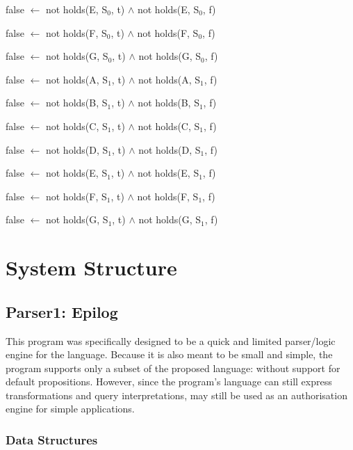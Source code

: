 \documentclass[a4paper]{article}
\begin{document}
\begin{list}{}{Complementary Rules}
            false $\leftarrow$ not holds(E, S$_{0}$, t) $\land$ not holds(E, S$_{0}$, f)
          \item
            false $\leftarrow$ not holds(F, S$_{0}$, t) $\land$ not holds(F, S$_{0}$, f)
          \item
            false $\leftarrow$ not holds(G, S$_{0}$, t) $\land$ not holds(G, S$_{0}$, f)
          \item
            false $\leftarrow$ not holds(A, S$_{1}$, t) $\land$ not holds(A, S$_{1}$, f)
          \item
            false $\leftarrow$ not holds(B, S$_{1}$, t) $\land$ not holds(B, S$_{1}$, f)
          \item
            false $\leftarrow$ not holds(C, S$_{1}$, t) $\land$ not holds(C, S$_{1}$, f)
          \item
            false $\leftarrow$ not holds(D, S$_{1}$, t) $\land$ not holds(D, S$_{1}$, f)
          \item
            false $\leftarrow$ not holds(E, S$_{1}$, t) $\land$ not holds(E, S$_{1}$, f)
          \item
            false $\leftarrow$ not holds(F, S$_{1}$, t) $\land$ not holds(F, S$_{1}$, f)
          \item
            false $\leftarrow$ not holds(G, S$_{1}$, t) $\land$ not holds(G, S$_{1}$, f)

        \end{list}

  \section{System Structure}

    \subsection{Parser1: Epilog}

      This program was specifically designed to be a quick and limited 
      parser/logic engine for the language. Because it is also meant to
      be small and simple, the program supports only a subset of the
      proposed language: without support for default propositions. However,
      since the program's language can still express transformations and query
      interpretations, may still be used as an authorisation engine for simple
      applications.

      \subsubsection{Data Structures}
\end{document}
